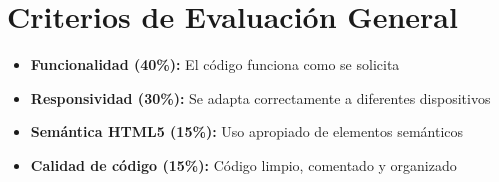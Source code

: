 \documentclass[12pt, a4paper]{article}
\begin{document}
\section*{Criterios de Evaluación General}
\begin{itemize}
\item \textbf{Funcionalidad (40\%):} El código funciona como se solicita
\item \textbf{Responsividad (30\%):} Se adapta correctamente a diferentes dispositivos
\item \textbf{Semántica HTML5 (15\%):} Uso apropiado de elementos semánticos
\item \textbf{Calidad de código (15\%):} Código limpio, comentado y organizado
\end{itemize}
\end{document}
